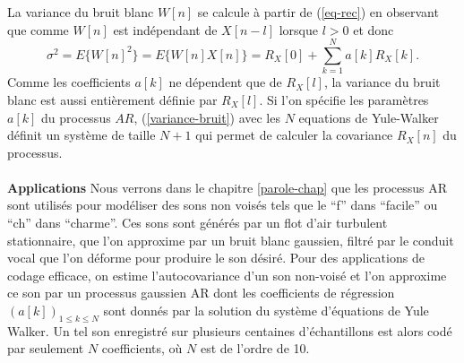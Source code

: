 La variance du bruit blanc $W [n]$ 
se calcule \`a partir de (\ref{eq-rec}) 
en observant que comme $W[n]$ est ind\'ependant de $X[n-l]$ 
lorsque $l > 0$ et donc
\begin{equation}
\label{variance-bruit}
\sigma^2 = E\{ W [n] ^ 2 \} = 
E\{ W [n] X[n] \} = 
R_X[0] + \sum_{k=1}^N a[k] R_X[k] .
\end{equation}
Comme les coefficients $a[k]$ ne d\'ependent que de $R_X[l]$,
la variance du bruit blanc est aussi enti\`erement d\'efinie
par $R_X [l]$.
Si l'on sp\'ecifie les param\`etres $a[k]$ du processus $AR$,
(\ref{variance-bruit}) avec les $N$ equations de Yule-Walker
d\'efinit un syst\`eme de taille $N+1$ qui permet de calculer la
covariance $R_X [n]$ du processus.
\\
\\
{\bf Applications}
Nous verrons dans le chapitre \ref{parole-chap} que
les processus AR sont utilis\'es pour mod\'eliser 
des sons non vois\'es tels que le
``f'' dans ``facile'' ou ``ch'' dans ``charme''.
Ces sons 
sont g\'en\'er\'es par un flot d'air turbulent 
stationnaire, que l'on 
approxime par un bruit blanc gaussien, 
filtr\'e par le conduit vocal que l'on d\'eforme pour produire
le son d\'esir\'e. Pour des applications de codage efficace, on
estime l'autocovariance d'un son non-vois\'e et l'on 
approxime ce son par un processus gaussien AR dont
les coefficients de r\'egression $(a[k])_{1 \leq k \leq N}$
sont donn\'es par la solution du syst\`eme
d'\'equations de Yule Walker. Un tel son enregistr\'e
sur plusieurs centaines d'\'echantillons est alors cod\'e par 
seulement $N$ coefficients, o\`u $N$ est de l'ordre de 10.












